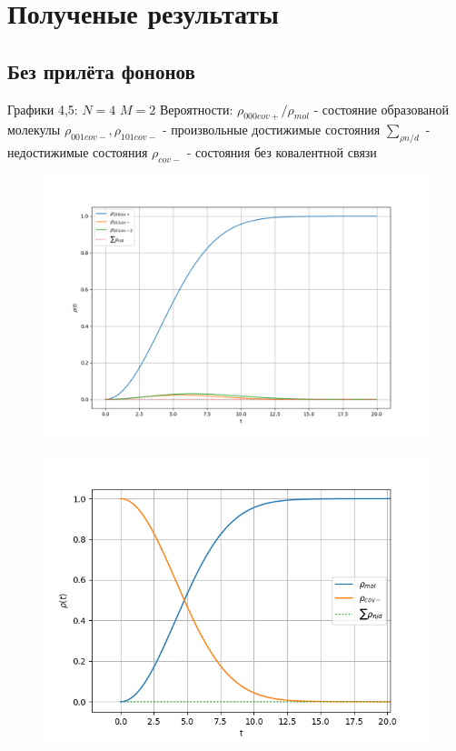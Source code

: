 \documentclass[12pt, a4paper]{article}
\begin{document}
\newpage
\section{Полученые результаты}
\subsection{Без прилёта фононов}
Графики 4,5:\newline
$N=4$\newline
$M=2$\newline
Вероятности:\newline
$\rho_{000cov+}/\rho_{mol}$ - состояние образованой молекулы\newline
$\rho_{001cov-},\rho_{101cov-}$ - произвольные достижимые состояния\newline
$\sum_{\rho n/d}$ - недостижимые состояния\newline
$\rho_{cov-}$ - состояния без ковалентной связи\newline
\begin{figure}[htp]
\centering
\includegraphics[scale=0.50]{Figure_1.png}
\caption{}
\label{}
\end{figure}
\begin{figure}[htp]
\centering
\includegraphics[scale=0.70]{Figure_3.png}
\caption{}
\label{}
\end{figure}
\newpage
\end{document}
